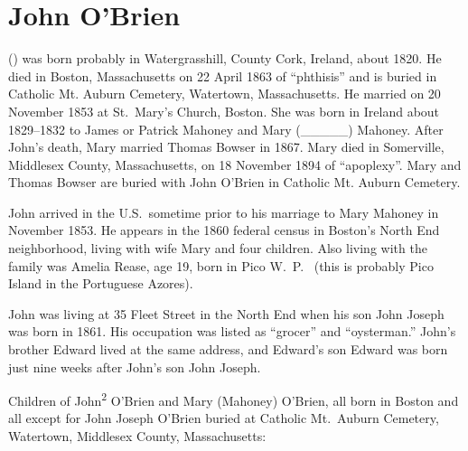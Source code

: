\section{John O'Brien}

  () was born probably in Watergrasshill, County Cork, Ireland, about 1820.\cite{John2OBrienMarriage} He died in Boston, Massachusetts on 22 April 1863 of ``phthisis'' \cite{John2OBrienDeath} and is buried in Catholic Mt. Auburn Cemetery, Watertown, Massachusetts.\cite{BillMcEvoy} He married  on 20 November 1853 at St.\ Mary's Church, Boston.\cite{John2OBrienMarriage} She was born in Ireland about 1829--1832 to James or Patrick Mahoney and Mary (\_\_\_\_\_)  Mahoney.\cite{John2OBrienCivilMarriage,MaryMahoneyBowserMarriage} After John's death, Mary married Thomas Bowser in 1867.\cite{MaryMahoneyBowserMarriage} Mary died in Somerville, Middlesex County, Massachusetts, on 18 November 1894 of ``apoplexy''\cite{MaryMahoneyDeath}. Mary and Thomas Bowser are buried with John O'Brien in Catholic Mt. Auburn Cemetery.\cite{BillMcEvoy}

John arrived in the U.S.\ sometime prior to his marriage to Mary Mahoney in November 1853. He appears in the 1860 federal census in Boston's North End neighborhood, living with wife Mary and four children. Also living with the family was Amelia Rease, age 19, born in Pico W.\ P.\ \cite{Census1860John} (this is probably Pico Island in the Portuguese Azores). 

John was living at 35 Fleet Street in the North End when his son John Joseph was born in 1861. His occupation was listed as ``grocer''\cite{John3OBrienBirth,Wards} and ``oysterman.''\cite{1861John2OBrien} John's brother Edward lived at the same address, and Edward's son Edward was born just nine weeks after John's son John Joseph.\cite{John3OBrienBirth}

\begin{KidsIntro}
	Children of John\textsuperscript{2} O'Brien and Mary (Mahoney) O'Brien, all born in Boston and all except for John Joseph O'Brien buried at Catholic Mt.\ Auburn Cemetery, Watertown, Middlesex County, Massachusetts:\cite{BillMcEvoy}
\end{KidsIntro}

